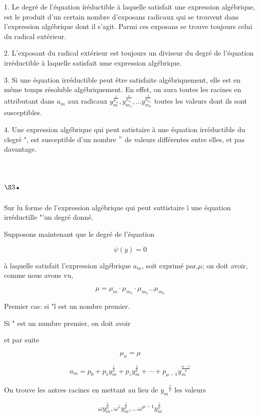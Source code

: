 \documentclass{article}
\begin{document}
1. Le degré de l'équation íréductible à laquelle satisfait une expression algébrique, est le produit d'un certain nombre d'exposans radicaux qui se trouvent dans l'expression algébrique dont il s'agit. Parmi ces exposans se trouve toujours celui du radical extérieur.

2. L'exposant du radical extérieur est toujours un diviseur du degré de l'équation irréductible à laquelle satisfait ume expression algébrique.

3. Si une équation irréductible peut être satisfaite algébriquement, elle est en même temps résoluble algébriquement. En effet, on aura toutes les racines en attributant dans \(a_{m}\) aux radicaux \(y_{m}^{\frac{1}{\mu_{m}}}, y_{m_{1}}^{\frac{1}{\mu_{m_{1}}}}, \ldots y_{m_{\nu}}^{\frac{1}{\mu_{m_{\nu}}}}\) toutes les valeurs dont ils sont susceptibles.

4. Une expression algébrique qui peut satistaire à une équation irréductible du clegré ", est susceptible d'un nombre \("\) de valeurs différentes entre elles, et pas davantage.

\section*{\(\S 3\).}

Sur lu forme de l'expression algébrique qui peut suttistaire ì une équation irréductille "'un degré donné.

Supposons maintenant que le degré de l'équation

\[
\psi(y)=0
\]

à laquelle satisfait l'expression algébrique \(a_{m}\), soit exprimé par,\(\mu\); on doit avoir, comme nous avons vu,

\[
\mu=\mu_{m} \cdot \mu_{m_{1}} \cdot \mu_{m_{2}} \ldots \mu_{m_{\nu}}
\]

Premier cas: si "l est un nombre premier.

Si " est un numbre premier, on doit avoir

et par suite

\[
\mu_{n}=\mu
\]

\[
a_{m}=p_{0}+p_{1} y_{m}^{\frac{1}{\mu}}+p_{z} y_{m}^{\frac{2}{\mu}}+\cdots+p_{\mu-1} y_{m}^{\frac{\mu-1}{\mu}}
\]

On trouve les antres racines en mettant au lieu de \(y_{m}{ }^{\frac{1}{\mu}}\) les valeurs

\[
\omega y_{m}^{\frac{1}{\mu}}, \omega^{z} y_{m}^{\frac{1}{\mu}}, \ldots \omega^{\mu-1} y_{m}^{\frac{1}{\mu}}
\]
\end{document}
